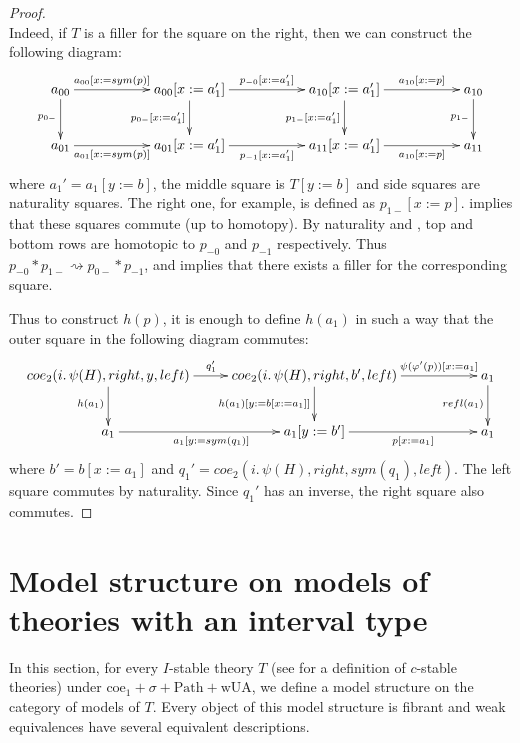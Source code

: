 \documentclass[reqno]{amsart}
\theoremstyle{definition}
\theoremstyle{remark}
\newcommand{\repl}{:=}
\newcommand{\idtype}{\rightsquigarrow}
\newcommand{\wUA}{\mathrm{wUA}}
\newcommand{\coe}{\mathrm{coe}}
\newcommand{\Path}{\mathrm{Path}}
\numberwithin{figure}{section}
\begin{document}
\begin{proof}
\[{            } \]
Indeed, if $T$ is a filler for the square on the right, then we can construct the following diagram:
\[ \xymatrix{ a_{00} \ar[rr]^-{a_{00}[x \repl sym(p)]} \ar[d]_{p_{0-}} & & a_{00}[x \repl a_1'] \ar[rr]^{p_{-0}[x \repl a_1']} \ar[d]_{p_{0-}[x \repl a_1']} & & a_{10}[x \repl a_1'] \ar[d]_{p_{1-}[x \repl a_1']} \ar[rr]^-{a_{10}[x \repl p]} & & a_{10} \ar[d]_{p_{1-}} \\
              a_{01} \ar[rr]_-{a_{01}[x \repl sym(p)]}                 & & a_{01}[x \repl a_1'] \ar[rr]_{p_{-1}[x \repl a_1']}                               & & a_{11}[x \repl a_1']                               \ar[rr]_-{a_{10}[x \repl p]} & & a_{11}
            } \]
where $a_1' = a_1[y \repl b]$, the middle square is $T[y \repl b]$ and side squares are naturality squares.
The right one, for example, is defined as $p_{1-}[x \repl p]$.
 implies that these squares commute (up to homotopy).
By naturality and , top and bottom rows are homotopic to $p_{-0}$ and $p_{-1}$ respectively.
Thus $p_{-0} * p_{1-} \idtype p_{0-} * p_{-1}$, and  implies that there exists a filler for the corresponding square.

Thus to construct $h(p)$, it is enough to define $h(a_1)$ in such a way that the outer square in the following diagram commutes:
\[ \xymatrix{ coe_2(i.\,\psi(H), right, y, left) \ar[r]^{q_1'} \ar[d]_{h(a_1)} & coe_2(i.\,\psi(H), right, b', left) \ar[rr]^-{\psi(\varphi'(p))[x \repl a_1]} \ar[d]_{h(a_1)[y \repl b[x \repl a_1]]} & & a_1 \ar[d]_{refl(a_1)} \\
              a_1 \ar[r]_{a_1[y \repl sym(q_1)]} & a_1[y \repl b'] \ar[rr]_-{p[x \repl a_1]}                                                                                                                           & & a_1
            } \]
where $b' = b[x \repl a_1]$ and $q_1' = coe_2(i.\,\psi(H), right, sym(q_1), left)$.
The left square commutes by naturality.
Since $q_1'$ has an inverse, the right square also commutes.
\end{proof}

\section{Model structure on models of theories with an interval type}
\label{sec:model-structure}

In this section, for every $I$-stable theory $T$ (see \cite{alg-tt} for a definition of $c$-stable theories)
under $\coe_1 + \sigma + \Path + \wUA$, we define a model structure on the category of models of $T$.
Every object of this model structure is fibrant and weak equivalences have several equivalent descriptions.
\end{document}
